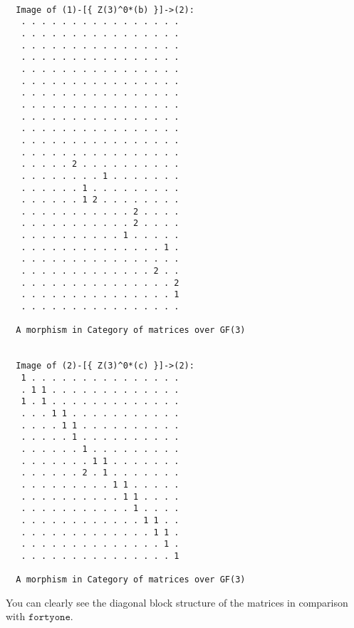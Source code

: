 \begin{computation}
\begin{Verbatim}[commandchars=!@B,fontsize=\small,frame=single,label=Example]
  
  Image of (1)-[{ Z(3)^0*(b) }]->(2):
   . . . . . . . . . . . . . . . .
   . . . . . . . . . . . . . . . .
   . . . . . . . . . . . . . . . .
   . . . . . . . . . . . . . . . .
   . . . . . . . . . . . . . . . .
   . . . . . . . . . . . . . . . .
   . . . . . . . . . . . . . . . .
   . . . . . . . . . . . . . . . .
   . . . . . . . . . . . . . . . .
   . . . . . . . . . . . . . . . .
   . . . . . . . . . . . . . . . .
   . . . . . . . . . . . . . . . .
   . . . . . 2 . . . . . . . . . .
   . . . . . . . . 1 . . . . . . .
   . . . . . . 1 . . . . . . . . .
   . . . . . . 1 2 . . . . . . . .
   . . . . . . . . . . . 2 . . . .
   . . . . . . . . . . . 2 . . . .
   . . . . . . . . . . 1 . . . . .
   . . . . . . . . . . . . . . 1 .
   . . . . . . . . . . . . . . . .
   . . . . . . . . . . . . . 2 . .
   . . . . . . . . . . . . . . . 2
   . . . . . . . . . . . . . . . 1
   . . . . . . . . . . . . . . . .
  
  A morphism in Category of matrices over GF(3)
  
  
  Image of (2)-[{ Z(3)^0*(c) }]->(2):
   1 . . . . . . . . . . . . . . .
   . 1 1 . . . . . . . . . . . . .
   1 . 1 . . . . . . . . . . . . .
   . . . 1 1 . . . . . . . . . . .
   . . . . 1 1 . . . . . . . . . .
   . . . . . 1 . . . . . . . . . .
   . . . . . . 1 . . . . . . . . .
   . . . . . . . 1 1 . . . . . . .
   . . . . . . 2 . 1 . . . . . . .
   . . . . . . . . . 1 1 . . . . .
   . . . . . . . . . . 1 1 . . . .
   . . . . . . . . . . . 1 . . . .
   . . . . . . . . . . . . 1 1 . .
   . . . . . . . . . . . . . 1 1 .
   . . . . . . . . . . . . . . 1 .
   . . . . . . . . . . . . . . . 1
  
  A morphism in Category of matrices over GF(3)
\end{Verbatim}
You can clearly see the diagonal block structure of the matrices in comparison with $\mathtt{fortyone}$.
\end{computation}










